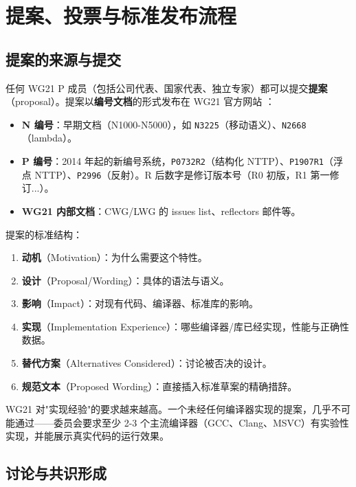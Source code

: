 \documentclass[12pt,a4paper,fontset=fandol]{ctexbook}
\newcommand{\paper}[1]{\texttt{#1}}
\begin{document}
\chapter{提案、投票与标准发布流程}

\section{提案的来源与提交}

任何 WG21 P 成员（包括公司代表、国家代表、独立专家）都可以提交\textbf{提案}（proposal）。提案以\textbf{编号文档}的形式发布在 WG21 官方网站 ：

\begin{itemize}
  \item \textbf{N 编号}：早期文档（N1000-N5000），如 \paper{N3225}（移动语义）、\paper{N2668}（lambda）。
  \item \textbf{P 编号}：2014 年起的新编号系统，\paper{P0732R2}（结构化 NTTP）、\paper{P1907R1}（浮点 NTTP）、\paper{P2996}（反射）。R 后数字是修订版本号（R0 初版，R1 第一修订...）。
  \item \textbf{WG21 内部文档}：CWG/LWG 的 issues list、reflectors 邮件等。
\end{itemize}

提案的标准结构：

\begin{enumerate}
  \item \textbf{动机}（Motivation）：为什么需要这个特性。
  \item \textbf{设计}（Proposal/Wording）：具体的语法与语义。
  \item \textbf{影响}（Impact）：对现有代码、编译器、标准库的影响。
  \item \textbf{实现}（Implementation Experience）：哪些编译器/库已经实现，性能与正确性数据。
  \item \textbf{替代方案}（Alternatives Considered）：讨论被否决的设计。
  \item \textbf{规范文本}（Proposed Wording）：直接插入标准草案的精确措辞。
\end{enumerate}

WG21 对"实现经验"的要求越来越高。一个未经任何编译器实现的提案，几乎不可能通过——委员会要求至少 2-3 个主流编译器（GCC、Clang、MSVC）有实验性实现，并能展示真实代码的运行效果。

\section{讨论与共识形成}
\end{document}
